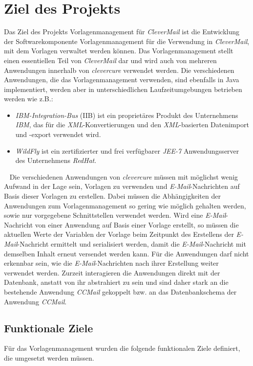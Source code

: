 \chapter{Ziel des Projekts}
\label{cha:Zielsetzung}
Das Ziel des Projekts Vorlagenmanagement für \emph{CleverMail} ist die Entwicklung der Softwarekomponente Vorlagenmanagement für die Verwendung in \emph{CleverMail}, mit dem Vorlagen verwaltet werden können. Das Vorlagenmanagement stellt einen essentiellen Teil von \emph{CleverMail} dar und wird auch von mehreren Anwendungen innerhalb von \emph{clevercure} verwendet werden. Die verschiedenen Anwendungen, die das Vorlagenmanagement verwenden, sind ebenfalls in Java implementiert, werden aber in unterschiedlichen Laufzeitumgebungen betrieben werden wie z.B.:
\begin{itemize}
	\item \emph{IBM-Integration-Bus} (IIB) ist ein proprietäres Produkt des Unternehmens \emph{IBM}, das für die \emph{XML}-Konvertierungen und den \emph{XML}-basierten Datenimport und -export verwendet wird.
	\item \emph{WildFly} ist ein zertifizierter und frei verfügbarer \emph{JEE-7} Anwendungsserver des Unternehmens \emph{RedHat}.
\end{itemize} 
\ \newline
Die verschiedenen Anwendungen von \emph{clevercure} müssen mit möglichst wenig Aufwand in der Lage sein, Vorlagen zu verwenden und \emph{E-Mail}-Nachrichten auf Basis dieser Vorlagen zu erstellen. Dabei müssen die Abhängigkeiten der Anwendungen zum Vorlagenmanagement so gering wie möglich gehalten werden, sowie nur vorgegebene Schnittstellen verwendet werden. Wird eine \emph{E-Mail}-Nachricht von einer Anwendung auf Basis einer Vorlage erstellt, so müssen die  aktuellen Werte der Variablen der Vorlage beim Zeitpunkt des Erstellens der \emph{E-Mail}-Nachricht ermittelt und serialisiert werden, damit die \emph{E-Mail}-Nachricht mit demselben Inhalt erneut versendet werden kann. Für die Anwendungen darf nicht erkennbar sein, wie die \emph{E-Mail}-Nachrichten nach ihrer Erstellung weiter verwendet werden.
\newline
\newline
Zurzeit interagieren die Anwendungen direkt mit der Datenbank, anstatt von ihr abstrahiert zu sein und sind daher stark an die bestehende Anwendung \emph{CCMail} gekoppelt bzw. an das Datenbankschema der Anwendung \emph{CCMail}.
\newpage

\section{Funktionale Ziele}
Für das Vorlagenmanagement wurden die folgende funktionalen Ziele definiert, die umgesetzt werden müssen.

